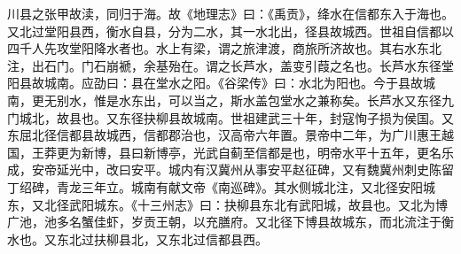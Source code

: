 \documentclass[12pt,UTF8]{ctexbook}
\begin{document}
川县之张甲故渎，同归于海。故《地理志》曰：《禹贡》，绛水在信都东入于海也。又北过堂阳县西，衡水自县，分为二水，其一水北出，径县故城西。世祖自信都以四千人先攻堂阳降水者也。水上有梁，谓之旅津渡，商旅所济故也。其右水东北注，出石门。门石崩褫，余基殆在。谓之长芦水，盖变引葭之名也。长芦水东径堂阳县故城南。应劭曰：县在堂水之阳。《谷梁传》曰：水北为阳也。今于县故城南，更无别水，惟是水东出，可以当之，斯水盖包堂水之兼称矣。长芦水又东径九门城北，故县也。又东径抉柳县故城南。世祖建武三十年，封寇恂子损为侯国。又东屈北径信都县故城西，信都郡治也，汉高帝六年置。景帝中二年，为广川惠王越国，王莽更为新博，县曰新博亭，光武自蓟至信都是也，明帝水平十五年，更名乐成，安帝延光中，改曰安平。城内有汉冀州从事安平赵征碑，又有魏冀州刺史陈留丁绍碑，青龙三年立。城南有献文帝《南巡碑》。其水侧城北注，又北径安阳城东，又北径武阳城东。《十三州志》曰：抉柳县东北有武阳城，故县也。又北为博广池，池多名蟹佳虾，岁贡王朝，以充膳府。又北径下博县故城东，而北流注于衡水也。又东北过扶柳县北，又东北过信都县西。
\end{document}
